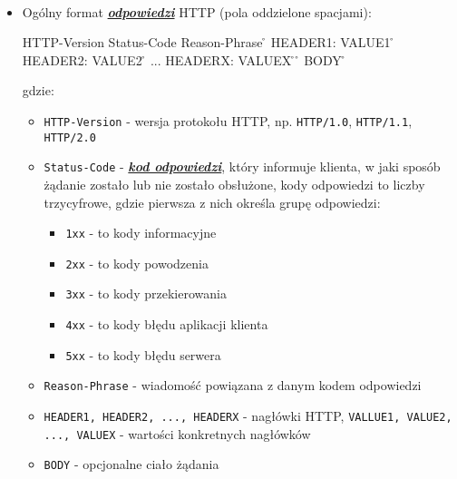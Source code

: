 \newpage 
{} \\

\begin{itemize}
\renewcommand{\labelitemi}{\scriptsize}

\item Ogólny format \href{https://www.w3.org/Protocols/rfc2616/rfc2616-sec6.html}{\textbf{\textit{odpowiedzi}}} HTTP (pola oddzielone spacjami):\\

\begin{code}
HTTP-Version   Status-Code   Reason-Phrase   \r\n
HEADER1: VALUE1 \r\n
HEADER2: VALUE2 \r\n
...
HEADERX: VALUEX \r\n
\r\n
BODY
\r\n
\end{code}

\noindent gdzie:

\begin{itemize}\renewcommand{\labelitemii}{\scriptsize}
\item \verb!HTTP-Version! - wersja protokołu HTTP, np. \texttt{HTTP/1.0}, \texttt{HTTP/1.1}, \texttt{HTTP/2.0}
\item \verb!Status-Code! - \href{https://www.w3.org/Protocols/rfc2616/rfc2616-sec6.html#sec6.1.1}{\textbf{\textit{kod odpowiedzi}}}, który informuje klienta, w jaki sposób żądanie zostało lub nie zostało obsłużone, kody odpowiedzi to liczby trzycyfrowe, gdzie pierwsza z nich określa grupę odpowiedzi:

\begin{itemize}
\item \verb!1xx! - to kody informacyjne
\item \verb!2xx! - to kody powodzenia
\item \verb!3xx! - to kody przekierowania
\item \verb!4xx! - to kody błędu aplikacji klienta
\item \verb!5xx! - to kody błędu serwera
\end{itemize}

\item \verb!Reason-Phrase! - wiadomość powiązana z danym kodem odpowiedzi
\item \verb!HEADER1, HEADER2, ..., HEADERX! - nagłówki HTTP, \verb!VALLUE1, VALUE2, ..., VALUEX! - wartości konkretnych nagłówków
\item \verb!BODY! - opcjonalne ciało żądania
\end{itemize}

\end{itemize}\mbox{}

